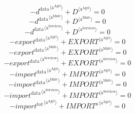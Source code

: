 \begin{equation}
-{d^{\mathrm{data}}}^{\langle \mathrm{\mathrm{a}^{\mathrm{Agri}}}\rangle} + {D}^{\langle \mathrm{a}^{\mathrm{Agri}}\rangle} = 0
\end{equation}
\begin{equation}
-{d^{\mathrm{data}}}^{\langle \mathrm{\mathrm{a}^{\mathrm{Mnfc}}}\rangle} + {D}^{\langle \mathrm{a}^{\mathrm{Mnfc}}\rangle} = 0
\end{equation}
\begin{equation}
-{d^{\mathrm{data}}}^{\langle \mathrm{\mathrm{a}^{\mathrm{Services}}}\rangle} + {D}^{\langle \mathrm{a}^{\mathrm{Services}}\rangle} = 0
\end{equation}
\begin{equation}
-{{e\!x\!p\!o\!r\!t}^{\mathrm{data}}}^{\langle \mathrm{\mathrm{a}^{\mathrm{Agri}}}\rangle} + {{E\!X\!P\!O\!R\!T}}^{\langle \mathrm{a}^{\mathrm{Agri}}\rangle} = 0
\end{equation}
\begin{equation}
-{{e\!x\!p\!o\!r\!t}^{\mathrm{data}}}^{\langle \mathrm{\mathrm{a}^{\mathrm{Mnfc}}}\rangle} + {{E\!X\!P\!O\!R\!T}}^{\langle \mathrm{a}^{\mathrm{Mnfc}}\rangle} = 0
\end{equation}
\begin{equation}
-{{e\!x\!p\!o\!r\!t}^{\mathrm{data}}}^{\langle \mathrm{\mathrm{a}^{\mathrm{Services}}}\rangle} + {{E\!X\!P\!O\!R\!T}}^{\langle \mathrm{a}^{\mathrm{Services}}\rangle} = 0
\end{equation}
\begin{equation}
-{{i\!m\!p\!o\!r\!t}^{\mathrm{data}}}^{\langle \mathrm{\mathrm{a}^{\mathrm{Agri}}}\rangle} + {{I\!M\!P\!O\!R\!T}}^{\langle \mathrm{a}^{\mathrm{Agri}}\rangle} = 0
\end{equation}
\begin{equation}
-{{i\!m\!p\!o\!r\!t}^{\mathrm{data}}}^{\langle \mathrm{\mathrm{a}^{\mathrm{Mnfc}}}\rangle} + {{I\!M\!P\!O\!R\!T}}^{\langle \mathrm{a}^{\mathrm{Mnfc}}\rangle} = 0
\end{equation}
\begin{equation}
-{{i\!m\!p\!o\!r\!t}^{\mathrm{data}}}^{\langle \mathrm{\mathrm{a}^{\mathrm{Services}}}\rangle} + {{I\!M\!P\!O\!R\!T}}^{\langle \mathrm{a}^{\mathrm{Services}}\rangle} = 0
\end{equation}
\begin{equation}
-{{i\!m\!p\!o\!r\!t}^{\mathrm{tot}}}^{\langle \mathrm{\mathrm{a}^{\mathrm{Agri}}}\rangle} + {{I\!M\!P\!O\!R\!T}^{\mathrm{a}}}^{\langle \mathrm{a}^{\mathrm{Agri}}\rangle} = 0
\end{equation}
